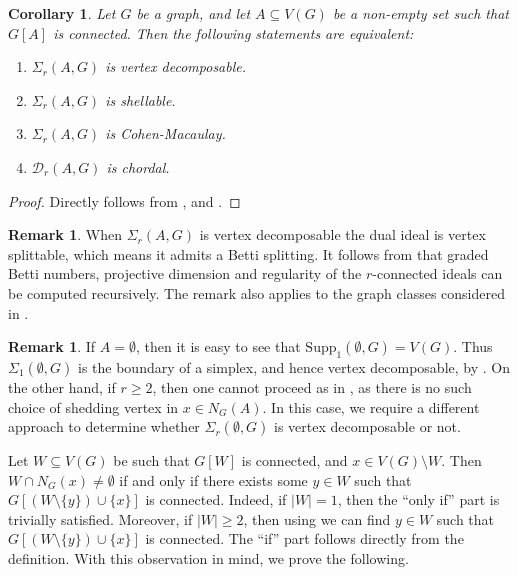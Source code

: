 \documentclass[12pt,reqno]{amsart}
\newtheorem{corollary}[proposition]{Corollary}
\theoremstyle{definition}
\newtheorem{remark}[proposition]{Remark}
\newcommand{\Supp}{\mathrm{Supp}}
\def\D{\mathcal{D}}
\begin{document}
\begin{corollary}
    Let $G$ be a graph, and let $A \subseteq V(G)$ be a non-empty set such that $G[A]$ is connected. Then the following statements are equivalent:
    \begin{enumerate}
        \item $\Sigma_r(A,G)$ is vertex decomposable.
        \item $\Sigma_r(A,G)$ is shellable.
        \item $\Sigma_r(A,G)$ is Cohen-Macaulay.
        \item $\D_r(A,G)$ is chordal. 
    \end{enumerate}
\end{corollary}
\begin{proof}
    Directly follows from ,  and \cite[Theorem 3.3]{SBCC}.
\end{proof}

\begin{remark}\label{betti_splitting}
    When $\Sigma_r(A,G)$ is vertex decomposable the dual ideal is vertex splittable, which means it admits a Betti splitting. 
    It follows from \cite[Theorem 2.3, Theorem 2.8, Remark 2.10]{MoradiAhang2016} that graded Betti numbers, projective dimension and regularity of the $r$-connected ideals can be computed recursively. 
    The remark also applies to the graph classes considered in .
\end{remark}
    
	\begin{remark}\label{remark 1}
		If $A=\emptyset$, then it is easy to see that $\Supp_1(\emptyset, G)=V(G)$. Thus $\Sigma_1(\emptyset, G)$ is the boundary of a simplex, and hence vertex decomposable, by \cite[Proposition 2.2]{ProBill1980}. On the other hand, if $r\ge 2$, then one cannot proceed as in , as there is no such choice of shedding vertex in $x\in N_G(A)$. In this case, we require a different approach to determine whether $\Sigma_r(\emptyset,G)$ is vertex decomposable or not.
	\end{remark}
	
	Let $W\subseteq V(G)$ be such that $G[W]$ is connected, and $x\in V(G)\setminus W$. Then $W\cap N_G(x)\neq\emptyset$ if and only if there exists some $y\in W$ such that $G[(W\setminus\{y\})\cup\{x\}]$ is connected. Indeed, if $|W|=1$, then the ``only if'' part is trivially satisfied. Moreover, if $|W|\ge 2$, then using  we can find $y\in W$ such that $G[(W\setminus\{y\})\cup\{x\}]$ is connected. The ``if'' part follows directly from the definition. With this observation in mind, we prove the following.
\end{document}

